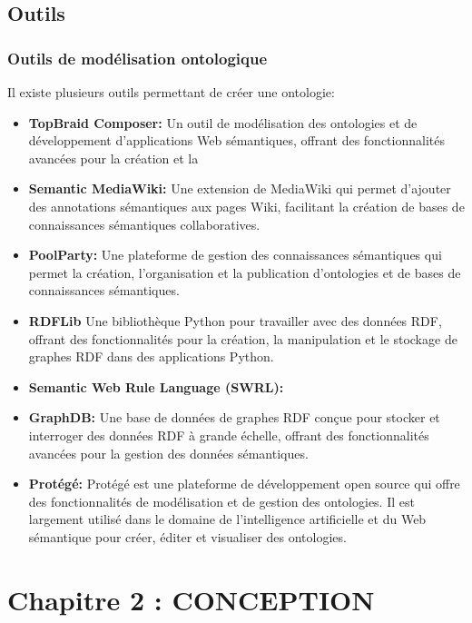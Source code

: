 \documentclass{article}
\begin{document}
	\subsection{Outils}
	\subsubsection{Outils de modélisation ontologique}
	Il existe plusieurs outils permettant de créer une ontologie:
	
	\begin{itemize}
		\item \textbf{TopBraid Composer: } Un outil de modélisation des ontologies et de développement d'applications Web sémantiques, offrant des fonctionnalités avancées pour la création et la 
		\item \textbf{Semantic MediaWiki:} Une extension de MediaWiki qui permet d'ajouter des annotations sémantiques aux pages Wiki, facilitant la création de bases de connaissances sémantiques collaboratives.
		\item \textbf{PoolParty:} Une plateforme de gestion des connaissances sémantiques qui permet la création, l'organisation et la publication d'ontologies et de bases de connaissances sémantiques.
		\item \textbf{RDFLib} Une bibliothèque Python pour travailler avec des données RDF, offrant des fonctionnalités pour la création, la manipulation et le stockage de graphes RDF dans des applications Python.
		\item \textbf{Semantic Web Rule Language (SWRL):}
		\item \textbf{GraphDB:} Une base de données de graphes RDF conçue pour stocker et interroger des données RDF à grande échelle, offrant des fonctionnalités avancées pour la gestion des données sémantiques.
		\item \textbf{Protégé:} Protégé est une plateforme de développement open source qui offre des fonctionnalités de modélisation et de gestion des ontologies. Il est largement utilisé dans le domaine de l'intelligence artificielle et du Web sémantique pour créer, éditer et visualiser des ontologies.
	\end{itemize}


	\section{Chapitre 2 : CONCEPTION}
\end{document}

